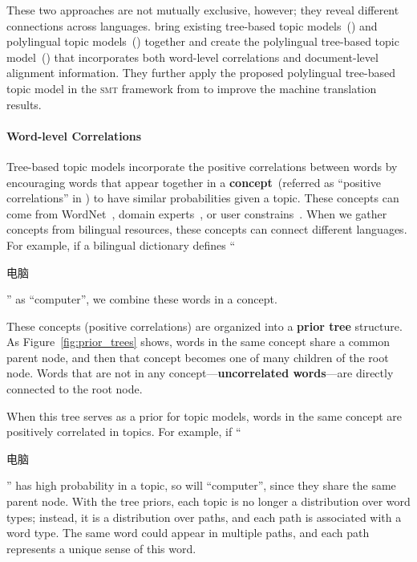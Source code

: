 These two approaches are not mutually exclusive, however; they reveal different connections across languages. \citet{hu-14} bring existing tree-based topic models~(\tlda{}) and polylingual topic models~(\plda{}) together and create the polylingual tree-based topic model~(\ptlda{}) that incorporates both word-level correlations and document-level alignment information. They further apply the proposed polylingual tree-based topic model in the \textsc{smt} framework from \citet{Eidelman-12} to improve the machine translation results.

\paragraph{\bf Word-level Correlations}

Tree-based topic models incorporate the positive correlations between words by encouraging words that appear together in a {\bf concept}~(referred as ``positive correlations'' in \citet{andrzejewski-09,Hu:Boyd-Graber:Satinoff-ur}) to have similar probabilities given a topic. These concepts can come from WordNet~\citep{boyd-graber-10}, domain experts~\citep{andrzejewski-09}, or user constrains~\citep{Hu:Boyd-Graber:Satinoff-ur}. When we gather concepts from bilingual resources, these concepts can connect different languages.  For example, if a bilingual dictionary defines ``\begin{CJK*}{UTF8}{gbsn}电脑\end{CJK*}'' as ``computer'', we combine these words in a concept.

These concepts (positive correlations) are organized into a {\bf prior tree} structure. As Figure~\ref{fig:prior_trees} shows, words in the same concept share a common parent node, and then that concept becomes one of many children of the root node.  Words that are not in any concept---{\bf uncorrelated words}---are directly connected to the root node.

When this tree serves as a prior for topic models, words in the same concept are positively correlated in topics. 
For example, if ``\begin{CJK*}{UTF8}{gbsn}电脑\end{CJK*}'' has high probability in a topic, so will ``computer'', since they share the same parent node. With the tree priors, each topic is no longer a distribution over word types; instead, it is a distribution over paths, and each path is
associated with a word type.  The same word could appear in multiple paths, and each path represents a unique sense of this word.

